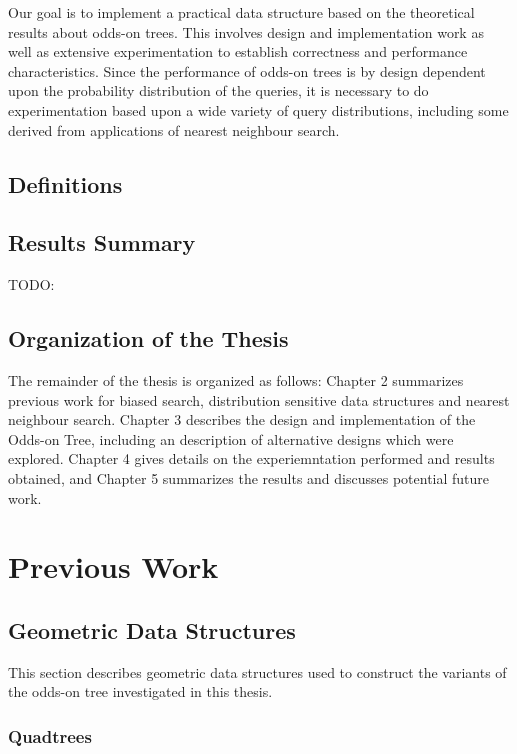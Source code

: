 \documentclass[mcs]{scsthesis}
\begin{document}
Our goal is to implement a practical data structure based on the theoretical
results about odds-on trees.  This involves design and implementation work as
well as extensive experimentation to establish correctness and performance
characteristics.  Since the performance of odds-on trees is by design
dependent upon the probability distribution of the queries, it is necessary
to do experimentation based upon a wide variety of query distributions,
including some derived from applications of nearest neighbour search.

\section{Definitions}

\section{Results Summary}

TODO:

\section{Organization of the Thesis}

The remainder of the thesis is organized as follows: Chapter 2 summarizes
previous work for biased search, distribution sensitive data structures and
nearest neighbour search.  Chapter 3 describes the design and implementation of
the Odds-on Tree, including an description of alternative designs which were
explored.  Chapter 4 gives details on the experiemntation performed and results
obtained, and Chapter 5 summarizes the results and discusses potential 
future work.

\chapter{Previous Work}

\section{Geometric Data Structures}

This section describes geometric data structures used to construct the variants
of the odds-on tree investigated in this thesis.

\subsection{Quadtrees}
\end{document}
